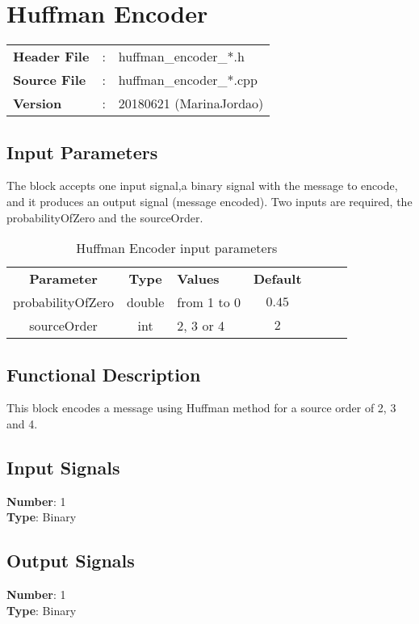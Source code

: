\clearpage

\section{Huffman Encoder}

\begin{tcolorbox}	
\begin{tabular}{p{2.75cm} p{0.2cm} p{10.5cm}} 	
\textbf{Header File}   &:& huffman\_encoder\_*.h \\
\textbf{Source File}   &:& huffman\_encoder\_*.cpp \\
\textbf{Version}       &:& 20180621 (MarinaJordao)
\end{tabular}
\end{tcolorbox}

\subsection*{Input Parameters}

The block accepts one input signal,a binary signal with the message to encode, and it produces an output signal (message encoded). 
Two inputs are required, the probabilityOfZero and the sourceOrder.

\begin{table}[h]
	\centering
	\begin{tabular}{|c|c|p{60mm}|c|ccp{60mm}}
		\cline{1-4}
		\textbf{Parameter} & \textbf{Type} & \textbf{Values} &   \textbf{Default}& \\ \cline{1-4}
		probabilityOfZero & double & from 1 to 0 & $0.45$ \\ \cline{1-4}
		sourceOrder & int & 2, 3 or 4 & $2$ \\ \cline{1-4}
	\end{tabular}
	\caption{Huffman Encoder input parameters}
	\label{table:sink_in_par}
\end{table}


\subsection*{Functional Description}


This block encodes a message using Huffman method for a source order of 2, 3 and 4. 

\subsection*{Input Signals}

\textbf{Number}: 1\\
\textbf{Type}: Binary 

\subsection*{Output Signals}

\textbf{Number}: 1\\
\textbf{Type}: Binary
%

